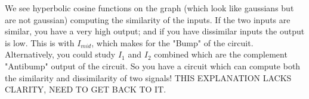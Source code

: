 We see hyperbolic cosine functions on the graph (which look like gaussians but are not gaussian) computing the similarity of the inputs. If the two inputs are similar, you have a very high output; and if you have dissimilar inputs the output is low. This is with $I_{mid}$, which makes for the "Bump" of the circuit. Alternatively, you could study $I_1$ and $I_2$ combined which are the complement "Antibump" output of the circuit. So you have a circuit which can compute both the similarity and dissimilarity of two signals! THIS EXPLANATION LACKS CLARITY, NEED TO GET BACK TO IT.
